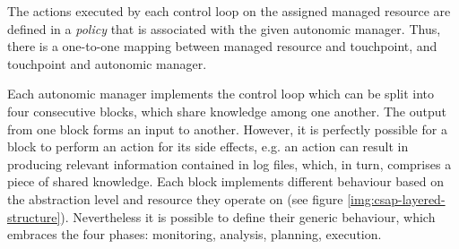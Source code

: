 The actions executed by each control loop on the assigned managed resource are defined in a \emph{policy} that is associated with the given autonomic manager. Thus, there is a one-to-one mapping between managed resource and touchpoint, and touchpoint and autonomic manager.

Each autonomic manager implements the control loop which can be split into four consecutive blocks, which share knowledge among one another. The output from one block forms an input to another. However, it is perfectly possible for a block to perform an action for its side effects, e.g. an action can result in producing relevant information contained in log files, which, in turn, comprises a piece of shared knowledge. Each block implements different behaviour based on the abstraction level and resource they operate on (see figure \ref{img:csap-layered-structure}). Nevertheless it is possible to define their generic behaviour, which embraces the four phases: monitoring, analysis, planning, execution.

